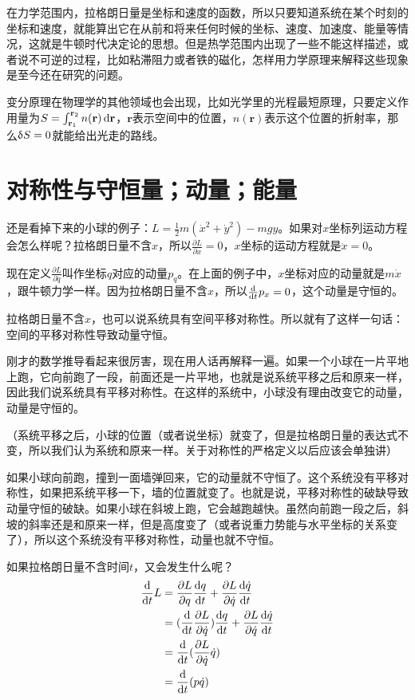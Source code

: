 在力学范围内，拉格朗日量是坐标和速度的函数，所以只要知道系统在某个时刻的坐标和速度，就能算出它在从前和将来任何时候的坐标、速度、加速度、能量等情况，这就是牛顿时代决定论的思想。但是热学范围内出现了一些不能这样描述，或者说不可逆的过程，比如粘滞阻力或者铁的磁化，怎样用力学原理来解释这些现象是至今还在研究的问题。

变分原理在物理学的其他领域也会出现，比如光学里的光程最短原理，只要定义作用量为$S=\int_{\mathbf{r}_1}^{\mathbf{r}_2} n(\mathbf{r}) \mathop{}\!\mathrm{d} \mathbf{r}$，$\mathbf{r}$表示空间中的位置，$n(\mathbf{r})$表示这个位置的折射率，那么$\mathop{}\!\updelta S=0$就能给出光走的路线。
\section{对称性与守恒量；动量；能量}
还是看掉下来的小球的例子：$L=\frac{1}{2}m(\dot x^2+\dot y^2)-m g y$。如果对$x$坐标列运动方程会怎么样呢？拉格朗日量不含$x$，所以$\frac{\partial L}{\partial x}=0$，$x$坐标的运动方程就是$\ddot x=0$。

现在定义$\frac{\partial L}{\partial \dot q}$叫作坐标$q$对应的动量$p_q$。在上面的例子中，$x$坐标对应的动量就是$m \dot x$，跟牛顿力学一样。因为拉格朗日量不含$x$，所以$\frac{\mathop{}\!\mathrm{d}}{\mathop{}\!\mathrm{d} t} p_x=0$，这个动量是守恒的。

拉格朗日量不含$x$，也可以说系统具有空间平移对称性。所以就有了这样一句话：空间的平移对称性导致动量守恒。

刚才的数学推导看起来很厉害，现在用人话再解释一遍。如果一个小球在一片平地上跑，它向前跑了一段，前面还是一片平地，也就是说系统平移之后和原来一样，因此我们说系统具有平移对称性。在这样的系统中，小球没有理由改变它的动量，动量是守恒的。

（系统平移之后，小球的位置（或者说坐标）就变了，但是拉格朗日量的表达式不变，所以我们认为系统和原来一样。关于对称性的严格定义以后应该会单独讲）

如果小球向前跑，撞到一面墙弹回来，它的动量就不守恒了。这个系统没有平移对称性，如果把系统平移一下，墙的位置就变了。也就是说，平移对称性的破缺导致动量守恒的破缺。如果小球在斜坡上跑，它会越跑越快。虽然向前跑一段之后，斜坡的斜率还是和原来一样，但是高度变了（或者说重力势能与水平坐标的关系变了），所以这个系统没有平移对称性，动量也就不守恒。

如果拉格朗日量不含时间$t$，又会发生什么呢？
\begin{align*}
\opdt L&=\frac{\partial L}{\partial q} \frac{\opd q}{\opd t}+\frac{\partial L}{\partial \dot q} \frac{\opd \dot q}{\opd t} \\
&=(\opdt \frac{\partial L}{\partial \dot q}) \frac{\opd q}{\opd t}+\frac{\partial L}{\partial \dot q} \frac{\opd \dot q}{\opd t} \\
&=\opdt(\frac{\partial L}{\partial \dot q} \dot q) \\
&=\opdt(p \dot q)
\end{align*}

